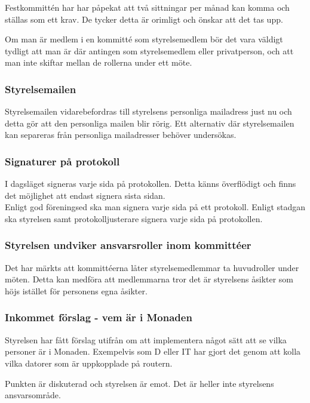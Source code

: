 \documentclass[protokoll]{dvd}
\begin{document}
Festkommittén har har påpekat att två sittningar per månad kan komma och ställas som ett krav. De tycker detta är orimligt och önskar att det tas upp.

Om man är medlem i en kommitté som styrelsemedlem bör det vara väldigt tydligt att man är där antingen som styrelsemedlem eller privatperson, och att man inte skiftar mellan de rollerna under ett möte.


\subsubsection{Styrelsemailen}

Styrelsemailen vidarebefordras till styrelsens personliga mailadress just nu och detta gör att den personliga mailen blir rörig. Ett alternativ där styrelsemailen kan separeras från personliga mailadresser behöver undersökas.


\subsubsection{Signaturer på protokoll}

I dagsläget signeras varje sida på protokollen. Detta känns överflödigt och finns det möjlighet att endast signera sista sidan.
\\
Enligt god föreningsed ska man signera varje sida på ett protokoll. Enligt stadgan ska styrelsen samt protokolljusterare signera varje sida på protokollen. 

\subsubsection{Styrelsen undviker ansvarsroller inom kommittéer}

Det har märkts att kommittéerna låter styrelsemedlemmar ta huvudroller under möten. Detta kan medföra att medlemmarna tror det är styrelsens åsikter som höjs istället för personens egna åsikter. 


\subsubsection{Inkommet förslag - vem är i Monaden}

Styrelsen har fått förslag utifrån om att implementera något sätt att se vilka personer är i Monaden. Exempelvis som D eller IT har gjort det genom att kolla vilka datorer som är uppkopplade på routern.

Punkten är diskuterad och styrelsen är emot. Det är heller inte styrelsens ansvarsområde.
\end{document}
